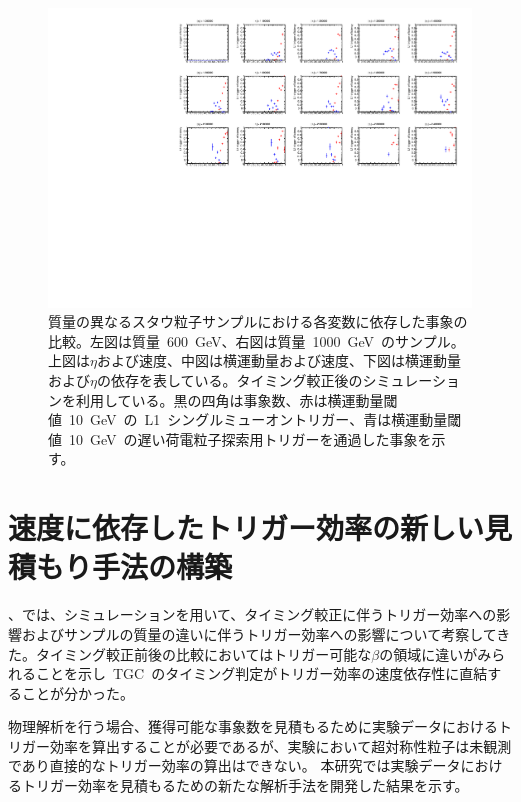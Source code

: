 \begin{figure}[tbp]
\begin{minipage}{0.49\hsize}
    \includegraphics[width=\textwidth,page=14]{img/rec/stau_1000.pdf}
    \end{minipage}
    \caption[質量の異なるスタウ粒子サンプルにおける各変数に依存した事象の比較]{質量の異なるスタウ粒子サンプルにおける各変数に依存した事象の比較。左図は質量~600~GeV、右図は質量~1000~GeV~のサンプル。上図は$\eta$および速度、中図は横運動量および速度、下図は横運動量および$\eta$の依存を表している。タイミング較正後のシミュレーションを利用している。黒の四角は事象数、赤は横運動量閾値~10~GeV~の~L1~シングルミューオントリガー、青は横運動量閾値~10~GeV~の遅い荷電粒子探索用トリガーを通過した事象を示す。}\label{fig:trietabeta6}
\end{figure}

\section{速度に依存したトリガー効率の新しい見積もり手法の構築}\label{sec:est}
、では、シミュレーションを用いて、タイミング較正に伴うトリガー効率への影響およびサンプルの質量の違いに伴うトリガー効率への影響について考察してきた。タイミング較正前後の比較においてはトリガー可能な$\beta$の領域に違いがみられることを示し~TGC~のタイミング判定がトリガー効率の速度依存性に直結することが分かった。

物理解析を行う場合、獲得可能な事象数を見積もるために実験データにおけるトリガー効率を算出することが必要であるが、実験において超対称性粒子は未観測であり直接的なトリガー効率の算出はできない。
本研究では実験データにおけるトリガー効率を見積もるための新たな解析手法を開発した結果を示す。

